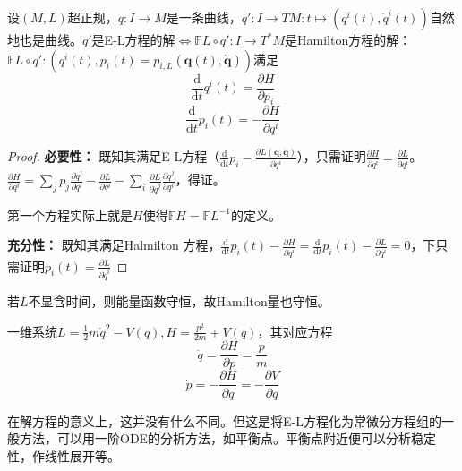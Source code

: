 \documentclass{ctexbook}
\begin{document}
\begin{Thm}
  设$(M,L)$超正规，$q:I\to M$是一条曲线，$q':I\to TM: t\mapsto (q^i(t), \dot{q}^i(t))$自然地也是曲线。$q'$是E-L方程的解$\Leftrightarrow \mathbb{F}L \circ q': I\to T^{*}M$是Hamilton方程的解：
  $\mathbb{F}L \circ q': (q^i(t), p_i(t)=p_{i,L}(\bm{q}(t), \bm{\dot{q}}))$满足
  \begin{equation*}
\frac{\mathrm{d}}{\mathrm{d}t}q^i(t)= \frac{\partial H}{\partial p_{i}}
  \end{equation*}
\begin{equation*}
\frac{\mathrm{d}}{\mathrm{d}t}p_i(t)= -\frac{\partial H}{\partial q^{i}}
\end{equation*}
\end{Thm}


\begin{proof}
  \textbf{必要性：} 既知其满足E-L方程（$\frac{\mathrm{d}}{\mathrm{d}t}p_i- \frac{\partial L(\bm{q},\bm{ \dot{q}})}{\partial q^i}$），只需证明$\frac{\partial H}{\partial q^{i}}= \frac{\partial L}{\partial q^{i}}$。$\frac{\partial H}{\partial q^{i}}=\sum\limits_j^{} p_j \frac{\partial \dot{q}^{j}}{\partial q^i}-\frac{\partial L}{\partial q^{i}}-\sum\limits_i^{}\frac{\partial L}{\partial \dot{q}^{j}}\frac{\partial \dot{q}^{j}}{\partial q^i}$，得证。

  第一个方程实际上就是$H$使得$\mathbb{F}H=\mathbb{F}L^{-1}$的定义。

  \textbf{充分性：} 既知其满足Halmilton 方程，$\frac{\mathrm{d}}{\mathrm{d}t}p_i(t)-\frac{\partial H}{\partial q^{i}}= \frac{\mathrm{d}}{\mathrm{d}t}p_i(t)-\frac{\partial L}{\partial q^{i}}=0$，下只需证明$p_i(t)=\frac{\partial L}{\partial \dot{q}^{i}}$
\end{proof}

若$L$不显含时间，则能量函数守恒，故Hamilton量也守恒。

\begin{Eg}
  一维系统$L=\frac{1}{2}m \dot{q}^2-V(q), H= \frac{p^2}{2m}+V(q)$，其对应方程
  \begin{equation*}
\dot{q}=\frac{\partial H}{\partial p}=\frac{p}{m}
\end{equation*}
\begin{equation*}
\dot{p}=-\frac{\partial H}{\partial q}=-\frac{\partial V}{\partial q}
\end{equation*}

在解方程的意义上，这并没有什么不同。但这是将E-L方程化为常微分方程组的一般方法，可以用一阶ODE的分析方法，如平衡点。平衡点附近便可以分析稳定性，作线性展开等。
\end{Eg}
\end{document}
